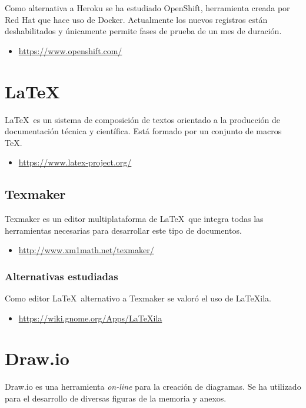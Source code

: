 Como alternativa a Heroku se ha estudiado OpenShift, herramienta creada por Red Hat que hace uso de Docker. Actualmente los nuevos registros están deshabilitados y únicamente permite fases de prueba de un mes de duración.

\begin{itemize}
	\item \url{https://www.openshift.com/}
\end{itemize}


\section{LaTeX}

\LaTeX\ es un sistema de composición de textos orientado a la producción de documentación técnica y científica. Está formado por un conjunto de macros \TeX.

\begin{itemize}
	\item \url{https://www.latex-project.org/}
\end{itemize}

\subsection{Texmaker}

Texmaker es un editor multiplataforma de \LaTeX\ que integra todas las herramientas necesarias para desarrollar este tipo de documentos.

\begin{itemize}
	\item \url{http://www.xm1math.net/texmaker/}
\end{itemize}

\subsubsection{Alternativas estudiadas}

Como editor \LaTeX\ alternativo a Texmaker se valoró el uso de LaTeXila.

\begin{itemize}
	\item \url{https://wiki.gnome.org/Apps/LaTeXila}
\end{itemize}

\section{Draw.io}

Draw.io es una herramienta \textit{on-line} para la creación de diagramas. Se ha utilizado para el desarrollo de diversas figuras de la memoria y anexos.

